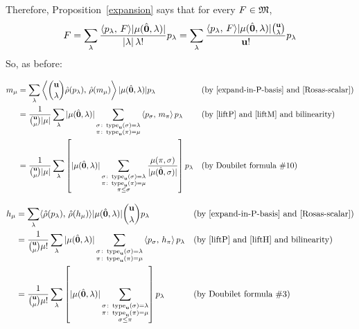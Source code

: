 Therefore, Proposition~\ref{expansion} says that for every $F\in\mathfrak{M}$,
\begin{equation} \label{expand-in-P-basis}
F = \sum_\lambda \frac{\langle p_\lambda,\,F\rangle |\mu(\hat{\mathbf{0}},\lambda)|}{|\lambda|\,\lambda!} p_\lambda
= \sum_\lambda \frac{\langle p_\lambda,\,F\rangle |\mu(\hat{\mathbf{0}},\lambda)| \binom{\mathbf{u}}{\lambda}}{\mathbf{u}!} p_\lambda
\end{equation}
So, as before:

\begin{align*}
m_\mu &= \sum_\lambda \left\langle \binom{\mathbf{u}}{\lambda}\hat\rho(p_\lambda),\,\hat\rho(m_\mu)\right\rangle |\mu(\hat{\mathbf{0}},\lambda)|  p_\lambda
	&&\text{(by~\eqref{expand-in-P-basis} and~\eqref{Rosas-scalar})}\\
&= \frac{1}{\binom{\mathbf{u}}{\mu}|\mu|} \sum_\lambda |\mu(\hat{\mathbf{0}},\lambda)| \sum_{\substack{\sigma\colon \operatorname{type}_{\mathbf{u}}(\sigma)=\lambda\\ \pi\colon \operatorname{type}_{\mathbf{u}}(\pi)=\mu}} \left\langle p_\sigma,\, m_\pi\right\rangle  p_\lambda
	&&\text{(by~\eqref{liftP} and~\eqref{liftM} and bilinearity)}\\
&= \frac{1}{\binom{\mathbf{u}}{\mu}|\mu|} \sum_\lambda\left[ |\mu(\hat{\mathbf{0}},\lambda)| \sum_{\substack{\sigma\colon \operatorname{type}_{\mathbf{u}}(\sigma)=\lambda\\ \pi\colon \operatorname{type}_{\mathbf{u}}(\pi)=\mu\\ \pi\leq\sigma}} \frac{\mu(\pi,\sigma)}{|\mu(\hat{\mathbf{0}},\sigma)|} \right] p_\lambda
	&&\text{(by Doubilet formula \#10)}\\
\end{align*}

\begin{align*}
h_\mu &= \sum_\lambda \langle \hat\rho(p_\lambda),\,\hat\rho(h_\mu)\rangle |\mu(\hat{\mathbf{0}},\lambda)| \binom{\mathbf{u}}{\lambda} p_\lambda
	&&\text{(by~\eqref{expand-in-P-basis} and~\eqref{Rosas-scalar})}\\
&= \frac{1}{\binom{\mathbf{u}}{\mu} \mu!} \sum_\lambda |\mu(\hat{\mathbf{0}},\lambda)| \sum_{\substack{\sigma\colon \operatorname{type}_{\mathbf{u}}(\sigma)=\lambda\\ \pi\colon \operatorname{type}_{\mathbf{u}}(\pi)=\mu}} \left\langle p_\sigma,\, h_\pi\right\rangle  p_\lambda
	&&\text{(by~\eqref{liftP} and~\eqref{liftH} and bilinearity)}\\
&= \frac{1}{\binom{\mathbf{u}}{\mu} \mu!} \sum_\lambda\left[ |\mu(\hat{\mathbf{0}},\lambda)| \sum_{\substack{\sigma\colon \operatorname{type}_{\mathbf{u}}(\sigma)=\lambda\\ \pi\colon \operatorname{type}_{\mathbf{u}}(\pi)=\mu\\ \sigma\leq\pi}} \right] p_\lambda
	&&\text{(by Doubilet formula \#3)}\\
\end{align*}


